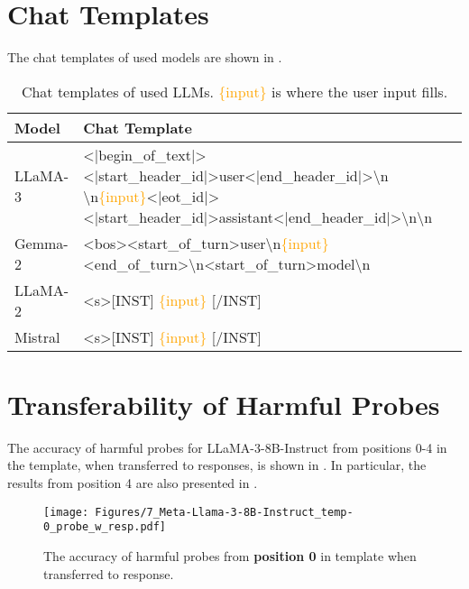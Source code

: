 \section{Chat Templates}

The chat templates of used models are shown in .

\begin{table*}[t]
\centering
\begin{tabularx}{\textwidth}{ 
    >{\RaggedRight}p{3cm}      %
    >{\Centering}X             %
}
\toprule
\textbf{Model} & \textbf{Chat Template} \\
\midrule
LLaMA-3 & <|begin\_of\_text|><|start\_header\_id|>user<|end\_header\_id|>\textbackslash n \textbackslash n\textcolor{orange}{\{input\}}<|eot\_id|><|start\_header\_id|>assistant<|end\_header\_id|>\textbackslash n\textbackslash n \\
\hline
Gemma-2 & <bos><start\_of\_turn>user\textbackslash n\textcolor{orange}{\{input\}}<end\_of\_turn>\textbackslash n<start\_of\_turn>model\textbackslash n \\
\hline
LLaMA-2 & <s>[INST] \textcolor{orange}{\{input\}} [/INST]  \\ \hline
Mistral & <s>[INST] \textcolor{orange}{\{input\}} [/INST] \\
\bottomrule
\end{tabularx}
\caption{Chat templates of used LLMs. \textcolor{orange}{\{input\}} is where the user input fills.}
\label{tab:chat_templates}
\end{table*}

\section{Transferability of Harmful Probes}
\label{appendix:probes}

The accuracy of harmful probes for LLaMA-3-8B-Instruct from positions 0-4 in the template, when transferred to responses, is shown in . In particular, the results from position 4 are also presented in .

\begin{figure}[t]
  \centering
  \texttt{[image: Figures/7\_Meta-Llama-3-8B-Instruct\_temp-0\_probe\_w\_resp.pdf]}
  \caption{The accuracy of harmful probes from \textbf{position 0} in template when transferred to response.}
  \label{fig:probe_in_resp_temp0}
\end{figure}

